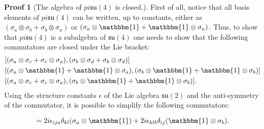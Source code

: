 \documentclass[%
 reprint,
 amsmath,amssymb,
 aps,
]{revtex4-2}
\theoremstyle{definition}%
\newtheorem{proof2}{Proof}[section]
\begin{document}
\begin{proof2}[The algebra of $pi\mathfrak{su}(4)$ is closed.]

First of all, notice that all basis elements of $pi\mathfrak{su}(4)$ can be written, up to constants, either as $(\sigma_a \otimes \sigma_b + \sigma_b \otimes \sigma_a) $ or $(\sigma_a \otimes \mathbbm{1} + \mathbbm{1} \otimes \sigma_a)$. Thus, to show that $pi \mathfrak{su}(4)$ is a subalgebra of $\mathfrak{su}(4)$ one needs to show that the following commutators are closed under the Lie bracket:
\begin{align}
    & [(\sigma_a \otimes \sigma_c + \sigma_c \otimes \sigma_a), (\sigma_b \otimes \sigma_d + \sigma_b \otimes \sigma_d)] \\ 
    \label{eq:commutator2}
    & [(\sigma_a \otimes \mathbbm{1} + \mathbbm{1} \otimes \sigma_a), (\sigma_b \otimes \mathbbm{1} + \mathbbm{1} \otimes \sigma_b)]\\
    \label{eq:commutator3}
    &[(\sigma_a \otimes \sigma_c + \sigma_c \otimes \sigma_a),(\sigma_b \otimes \mathbbm{1} + \mathbbm{1} \otimes \sigma_b) ].
\end{align}
Using the structure constants $\epsilon$ of the Lie algebra 
$\mathfrak{su}(2)$ and the anti-symmetry of the commutator, it is possible to simplify the following commutators:

\begin{equation*}
[\sigma_i \otimes \sigma_k, \sigma_j \otimes \sigma_l ]= 2 i \epsilon_{ija}\delta_{kl}(\sigma_a \otimes \mathbbm{1})+ 2i \epsilon_{klb}\delta_{ij}(\mathbbm{1} \otimes \sigma_b).
\end{equation*}




\end{proof2}
\end{document}
